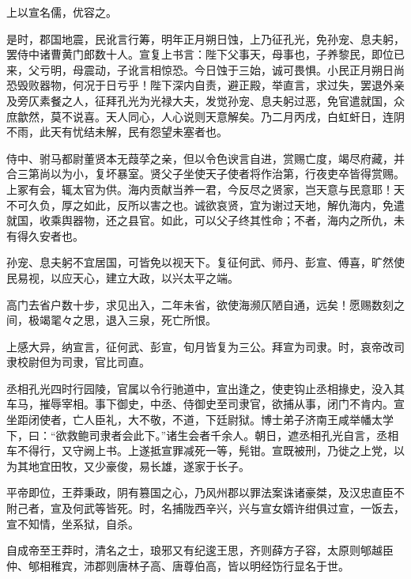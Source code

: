 \documentclass[12pt,UTF8]{ctexbook}
\begin{document}
上以宣名儒，优容之。



是时，郡国地震，民讹言行筹，明年正月朔日蚀，上乃征孔光，免孙宠、息夫躬，罢侍中诸曹黄门郎数十人。宣复上书言：陛下父事天，母事也，子养黎民，即位已来，父亏明，母震动，子讹言相惊恐。今日蚀于三始，诚可畏惧。小民正月朔日尚恐毁败器物，何况于日亏乎！陛下深内自责，避正殿，举直言，求过失，罢退外亲及旁仄素餐之人，征拜孔光为光禄大夫，发觉孙宠、息夫躬过恶，免官遣就国，众庶歙然，莫不说喜。天人同心，人心说则天意解矣。乃二月丙戌，白虹虷日，连阴不雨，此天有忧结未解，民有怨望未塞者也。



侍中、驸马都尉董贤本无葭莩之亲，但以令色谀言自进，赏赐亡度，竭尽府藏，并合三第尚以为小，复坏暴室。贤父子坐使天子使者将作治第，行夜吏卒皆得赏赐。上冢有会，辄太官为供。海内贡献当养一君，今反尽之贤家，岂天意与民意耶！天不可久负，厚之如此，反所以害之也。诚欲哀贤，宜为谢过天地，解仇海内，免遣就国，收乘舆器物，还之县官。如此，可以父子终其性命；不者，海内之所仇，未有得久安者也。



孙宠、息夫躬不宜居国，可皆免以视天下。复征何武、师丹、彭宣、傅喜，旷然使民易视，以应天心，建立大政，以兴太平之端。



高门去省户数十步，求见出入，二年未省，欲使海濒仄陋自通，远矣！愿赐数刻之间，极竭毣々之思，退入三泉，死亡所恨。



上感大异，纳宣言，征何武、彭宣，旬月皆复为三公。拜宣为司隶。时，哀帝改司隶校尉但为司隶，官比司直。



丞相孔光四时行园陵，官属以令行驰道中，宣出逢之，使吏钩止丞相掾史，没入其车马，摧辱宰相。事下御史，中丞、侍御史至司隶官，欲捕从事，闭门不肯内。宣坐距闭使者，亡人臣礼，大不敬，不道，下廷尉狱。博士弟子济南王咸举幡太学下，曰：“欲救鲍司隶者会此下。”诸生会者千余人。朝日，遮丞相孔光自言，丞相车不得行，又守阙上书。上遂抵宣罪减死一等，髡钳。宣既被刑，乃徙之上党，以为其地宜田牧，又少豪俊，易长雄，遂家于长子。



平帝即位，王莽秉政，阴有篡国之心，乃风州郡以罪法案诛诸豪桀，及汉忠直臣不附己者，宣及何武等皆死。时，名捕陇西辛兴，兴与宣女婿许绀俱过宣，一饭去，宣不知情，坐系狱，自杀。



自成帝至王莽时，清名之士，琅邪又有纪逡王思，齐则薛方子容，太原则郇越臣仲、郇相稚宾，沛郡则唐林子高、唐尊伯高，皆以明经饬行显名于世。
\end{document}
